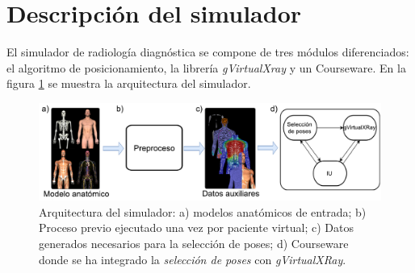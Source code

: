 


\section{Descripción del simulador} 
\label{xray:method}


El simulador de radiología diagnóstica se compone de tres módulos diferenciados: el algoritmo de posicionamiento, la librería \emph{gVirtualXray} y un \ac{Courseware}. En la figura \ref{fig:Posesummary} se muestra la arquitectura del simulador.

\begin{figure}[ht]
\centering
\includegraphics[width=\linewidth]{IMG/ArquXRAY.pdf}

\caption{\label{fig:Posesummary} Arquitectura del simulador: a) modelos anatómicos de entrada; b) Proceso previo ejecutado una vez por paciente virtual; c) Datos generados necesarios para la selección de poses; d) \acs{Courseware} donde se ha integrado la \emph{selección de poses} con \emph{gVirtualXRay}.
}
\end{figure}

